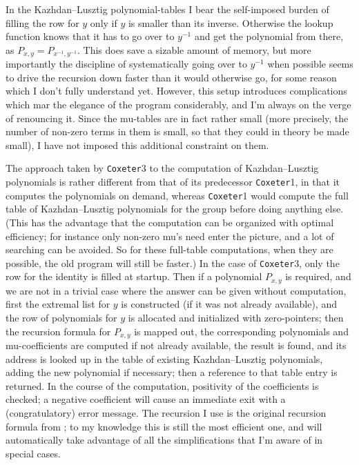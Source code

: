 \documentclass[11pt]{article}
\newcommand{\coxeter}{{\tt Coxeter}}
\newcommand{\klpol}{Kazh\-dan--Lusz\-tig po\-ly\-no\-mial}
\begin{document}
In the \klpol-tables I bear the self-imposed burden of filling the row
for $y$ only if $y$ is smaller than its inverse. Otherwise the lookup
function knows that it has to go over to $y^{-1}$ and get the polynomial
from there, as $P_{x,y}=P_{x^{-1},y^{-1}}$. This does save a sizable amount
of memory, but more importantly the discipline of systematically going over
to $y^{-1}$ when possible seems to drive the recursion down faster than it
would otherwise go, for some reason which I don't fully understand yet. 
However, this setup introduces 
complications which mar the elegance of the program considerably, and I'm
always on the verge of renouncing it. Since the mu-tables are in fact
rather small (more precisely, the number of non-zero terms in them is small,
so that they could in theory be made small), I have not imposed this
additional constraint on them.

The approach taken by \coxeter3 to the computation of \klpol s is rather
different from that of its predecessor \coxeter1, in that it computes
the polynomials on demand, whereas \coxeter1 would compute the full table
of \klpol s for the group before doing anything else. (This has the advantage
that the computation can be organized with optimal efficiency; for instance
only non-zero mu's need enter the picture, and a lot of searching can be
avoided. So for these full-table computations, when they are possible, the old
program will still be faster.) In the case of \coxeter3, only the row for
the identity is filled at startup. Then if a polynomial $P_{x,y}$ is required,
and we are not in a trivial case where the answer can be given without
computation, first the extremal list for $y$ is constructed (if it was not
already available), and the row of polynomials for $y$ is allocated and
initialized with zero-pointers; then the recursion formula for $P_{x,y}$ is
mapped out, the corresponding polynomials and mu-coefficients are computed
if not already available, the result is found, and its address is looked up
in the table of existing \klpol s, adding the new polynomial if necessary;
then a reference to that table entry is returned. In the course of the
computation, positivity of the coefficients is checked; a negative coefficient
will cause an immediate exit with a (congratulatory) error message. The
recursion I use is the original recursion formula from \cite{kl:1979}; to my 
knowledge this is still the most efficient one, and will automatically take 
advantage of all the simplifications that I'm aware of in special cases.
\end{document}
